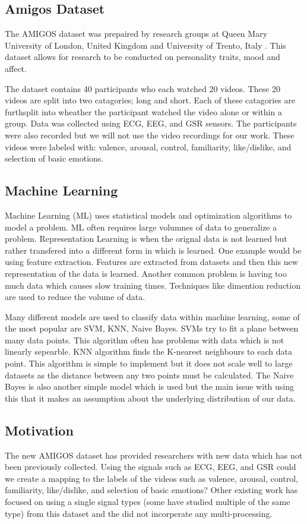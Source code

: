 \subsection{Amigos Dataset}
The AMIGOS dataset was prepaired by research groups at
Queen Mary University of London, United Kingdom and
University of Trento, Italy \cite{AMIGOS:2018}.
This dataset allows for research to be conducted on
personality traits, mood and affect.

The dataset contains 40 participants who each watched 20 videos.
These 20 videos are split into two catagories; long and short.
Each of these catagories are furthsplit into
wheather the participant watched the video alone or within a group.
Data was collected using ECG, EEG, and GSR sensors.
The participants were also recorded but we will not use the video recordings
for our work.
These videos were labeled with:
valence, arousal, control, familiarity, like/dislike,
and selection of basic emotions.

\subsection{Machine Learning}
Machine Learning (ML) uses statistical models and
optimization algorithms to model a problem.
ML often requires large volumnes of data to generalize a problem.
Representation Learning is when the orignal data is not learned
but rather transfered into a different form in which is learned.
One example would be using feature extraction.
Features are extracted from datasets and then this new representation of the data
is learned.
Another common problem is having too much data which causes slow training times.
Techniques like dimention reduction are used to reduce the volume of
data.

Many different models are used to classify data within machine learning,
some of the most popular are SVM, KNN, Naive Bayes.
SVMs try to fit a plane between many data points.
This algorithm often has problems with data which is not
linearly sepearble.
KNN algorithm finds the K-nearest neighbours to each data point.
This algorithm is simple to implement but it does not scale well
to large datasets as the distance between any two points must be calculated.
The Naive Bayes is also another simple model which is used but the main issue
with using this that it makes an assumption about the underlying distribution of
our data.

\subsection{Motivation}
The new AMIGOS dataset has provided researchers with new
data which has not been previously collected.
Using the signals such as ECG, EEG, and GSR
could we create a mapping to the
labels of the videos such as
valence, arousal, control, familiarity, like/dislike,
and selection of basic emotions?
Other existing work has focused on using a single signal types
(some have studied multiple of the same type) from this dataset
and the did not incorperate any multi-processing.
